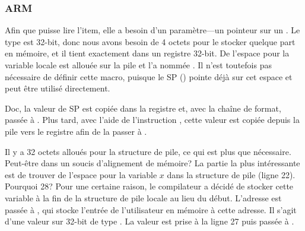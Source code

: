 \subsubsection{ARM}

\myparagraph{\OptimizingKeilVI (\ThumbMode)}



\myindex{\CLanguageElements!\Pointers}

Afin que \scanf puisse lire l'item, elle a besoin d'un paramètre---un pointeur sur un \Tint.
Le type \Tint est 32-bit, donc nous avons besoin de 4 octets pour le stocker quelque
part en mémoire, et il tient exactement dans un registre 32-bit.
De l'espace pour la variable locale  est allouée sur la pile et \IDA l'a
nommée . Il n'est toutefois pas nécessaire de définir cette macro, puisque
le \ac{SP} () pointe déjà sur cet espace et
peut être utilisé directement.

Doc, la valeur de \ac{SP} est copiée dans la registre  et, avec la chaîne
de format, passée à \scanf.
Plus tard, avec l'aide de l'instruction , cette valeur est copiée depuis
la pile vers le registre  afin de la passer à \printf.




Il y a 32 octets alloués pour la structure de pile, ce qui est plus que nécessaire.
Peut-être dans un soucis d'alignement de mémoire?
La partie la plus intéressante est de trouver de l'espace pour la variable $x$ dans
la structure de pile (ligne 22).
Pourquoi 28? Pour une certaine raison, le compilateur a décidé de stocker cette
variable à la fin de la structure de pile locale au lieu du début.
L'adresse est passée à \scanf, qui stocke l'entrée de l'utilisateur en mémoire à
cette adresse.
Il s'agit d'une valeur sur 32-bit de type \Tint.
La valeur est prise à la ligne 27 puis passée à \printf.

